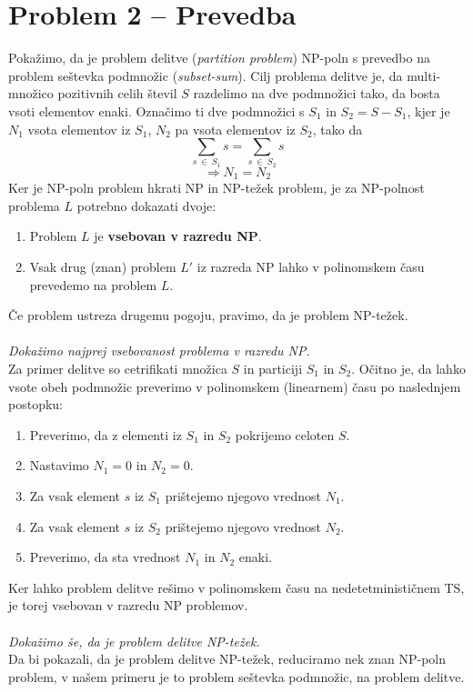 \documentclass[a4paper,11pt]{article}
\begin{document}
\section*{Problem 2 -- Prevedba}
Pokažimo, da je problem delitve (\textit{partition problem}) NP-poln s prevedbo na problem seštevka podmnožic (\textit{subset-sum}). 
Cilj problema delitve je, da multi-množico pozitivnih celih števil $S$ razdelimo na dve podmnožici tako, da bosta vsoti elementov enaki.
Označimo ti dve podmnožici s $S_1$ in $S_2 = S - S_1$, kjer je $N_1$ vsota elementov iz $S_1$, $N_2$ pa vsota elementov iz $S_2$, tako da
$$
\sum_{s \ \in \ S_1} s = \sum_{s \ \in \ S_2} s 
$$
$$
\Rightarrow N_1 = N_2
$$
Ker je NP-poln problem hkrati NP in NP-težek problem, je za NP-polnost problema $L$ potrebno dokazati dvoje:
\begin{enumerate}
    \item Problem $L$ je \textbf{vsebovan v razredu NP}.
    \item Vsak drug (znan) problem $L'$ iz razreda NP lahko v polinomskem času prevedemo na problem $L$. 
\end{enumerate}
\noindent
Če problem ustreza drugemu pogoju, pravimo, da je problem NP-težek.
\\
\\
\textit{Dokažimo najprej vsebovanost problema v razredu NP.}
\\
Za primer delitve so cetrifikati množica $S$ in particiji $S_1$ in $S_2$. 
Očitno je, da lahko vsote obeh podmnožic preverimo v polinomskem (linearnem) času po naslednjem postopku:
\begin{enumerate}
    \item Preverimo, da z elementi iz $S_1$ in $S_2$ pokrijemo celoten $S$.
    \item Nastavimo $N_1 = 0$ in $N_2 = 0$.
    \item Za vsak element $s$ iz $S_1$ prištejemo njegovo vrednost $N_1$.
    \item Za vsak element $s$ iz $S_2$ prištejemo njegovo vrednost $N_2$.
    \item Preverimo, da sta vrednost $N_1$ in $N_2$ enaki.
\end{enumerate}
Ker lahko problem delitve rešimo v polinomskem času na nedetetminističnem TS, je torej vsebovan v razredu NP problemov.
\\
\\
\textit{Dokažimo še, da je problem delitve NP-težek.}
\\
Da bi pokazali, da je problem delitve NP-težek, reduciramo nek znan NP-poln problem, v našem primeru je to problem seštevka podmnožic, na problem delitve.
\end{document}
